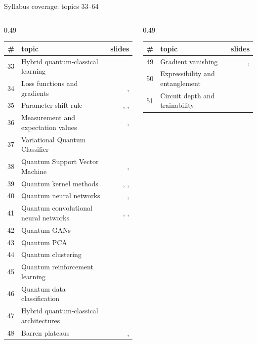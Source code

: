 \documentclass[aspectratio=169,11pt]{beamer}
\begin{document}
\begin{frame}{Syllabus coverage: topics 33--64}
  \tiny
  \begin{columns}[T]
    \begin{column}{0.49\textwidth}
\begin{tabular}{rlr}\toprule \# & topic & slides\\ \midrule
33 & Hybrid quantum-classical learning & \pageref{fHybrid} \\
34 & Loss functions and gradients & \pageref{fLossOut}, \pageref{fPSC} \\
35 & Parameter-shift rule & \pageref{fPSD}, \pageref{fPSC}, \pageref{fPSF} \\
36 & Measurement and expectation values & \pageref{fCirc}, \pageref{fLossOut} \\
37 & Variational Quantum Classifier & \pageref{fVQC} \\
38 & Quantum Support Vector Machine & \pageref{fQSVM}, \pageref{fKSVM} \\
39 & Quantum kernel methods & \pageref{fKern}, \pageref{fQSVM}, \pageref{fKSVM} \\
40 & Quantum neural networks & \pageref{fQNN}, \pageref{fQCNN} \\
41 & Quantum convolutional neural networks & \pageref{fQCNN}, \pageref{fBlocks}, \pageref{fSize} \\
42 & Quantum GANs & \pageref{fGAN} \\
43 & Quantum PCA & \pageref{fPCA} \\
44 & Quantum clustering & \pageref{fClusRL} \\
45 & Quantum reinforcement learning & \pageref{fClusRL} \\
46 & Quantum data classification & \pageref{fQData} \\
47 & Hybrid quantum-classical architectures & \pageref{fHArch} \\
48 & Barren plateaus & \pageref{fBP}, \pageref{fBPm} \\
\bottomrule\end{tabular}
    \end{column}
    \begin{column}{0.49\textwidth}
\begin{tabular}{rlr}\toprule \# & topic & slides\\ \midrule
49 & Gradient vanishing & \pageref{fBP}, \pageref{fBPm} \\
50 & Expressibility and entanglement & \pageref{fExpr} \\
51 & Circuit depth and trainability & \pageref{fExpr} \\

\end{tabular}
\end{column}
\end{columns}
\end{frame}
\end{document}
